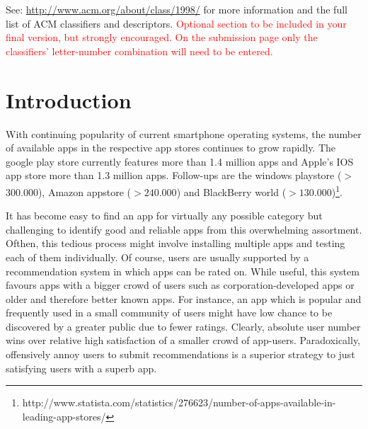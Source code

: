 \documentclass{sigchi}
\begin{document}
See: \url{http://www.acm.org/about/class/1998/}
for more information and the full list of ACM classifiers
and descriptors. \newline
\textcolor{red}{Optional section to be included in your final version, 
but strongly encouraged. On the submission page only the classifiers’ 
letter-number combination will need to be entered.}

\section{Introduction}

% 


With continuing popularity of current smartphone operating systems, the number of available apps in the respective app stores continues to grow rapidly.
The google play store currently features more than 1.4 million apps and Apple's IOS app store more than 1.3 million apps. 
Follow-ups are the windows playstore ($>$300.000), Amazon appstore ($>240.000$) and BlackBerry world ($>130.000$)\footnote{http://www.statista.com/statistics/276623/number-of-apps-available-in-leading-app-stores/}.

It has become easy to find an app for virtually any possible category but challenging to identify good and reliable apps from this overwhelming assortment. 
Ofthen, this tedious process might involve installing multiple apps and testing each of them individually. 
Of course, users are usually supported by a recommendation system in which apps can be rated on.
While useful, this system favours apps with a bigger crowd of users such as corporation-developed apps or older and therefore better known apps.
For instance, an app which is popular and frequently used in a small community of users might have low chance to be discovered by a greater public due to fewer ratings. 
Clearly, absolute user number wins over relative high satisfaction of a smaller crowd of app-users.
Paradoxically, offensively annoy users to submit recommendations is a superior strategy to just satisfying users with a superb app.  
\end{document}
